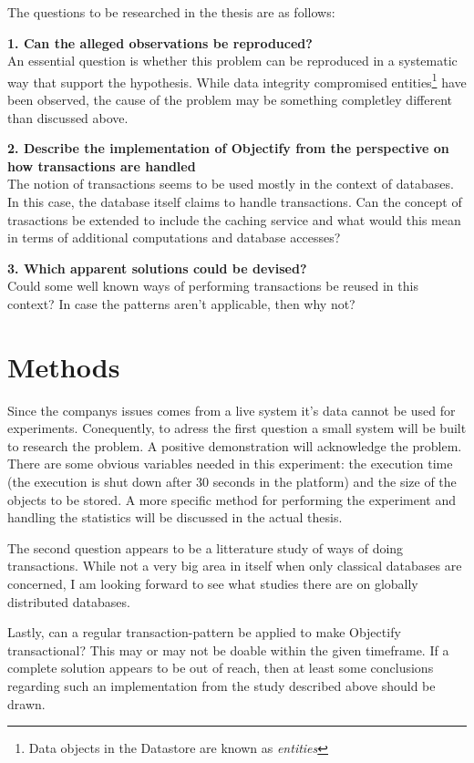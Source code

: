 \documentclass[10pt, titlepage, oneside, a4paper]{article}
\begin{document}
The questions to be researched in the thesis are as follows:

\textbf{1. Can the alleged observations be reproduced?}\\
An essential question is whether this problem can be reproduced in a
systematic way that support the hypothesis. While data integrity
compromised entities\footnote{Data objects in the Datastore are known
  as \emph{entities}} have been observed, the cause of the problem may
be something completley different than discussed above.

\textbf{2. Describe the implementation of Objectify from the
  perspective on how transactions are handled}\\ The notion of transactions seems to be used mostly in the context of
databases. In this case, the database itself claims to handle
transactions. Can the concept of trasactions be extended to include
the caching service and what would this mean in terms of additional
computations and database accesses?

\textbf{3. Which apparent solutions could be devised?}\\
Could some well known ways of performing transactions be reused in
this context? In case the patterns aren't applicable, then why not?


\section*{Methods}

Since the companys issues comes from a live system it’s data cannot
be used for experiments. Conequently, to adress the first question a
small system will be built to research the problem. A positive
demonstration will acknowledge the problem. There are some obvious
variables needed in this experiment: the execution time (the execution
is shut down after 30 seconds in the platform) and the size of the
objects to be stored. A more specific method for performing the experiment
and handling the statistics will be discussed in the actual thesis.

The second question appears to be a litterature study of ways of doing
transactions. While not a very big area in itself when only classical
databases are concerned, I am looking forward to see what studies
there are on globally distributed databases.

Lastly, can a regular transaction-pattern be applied to make Objectify
transactional? This may or may not be doable within the given
timeframe. If a complete solution appears to be out of reach, then at
least some conclusions regarding such an implementation from the study
described above should be drawn. 
\end{document}
